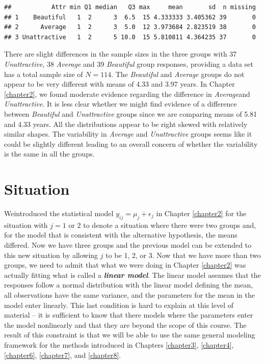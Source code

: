 \documentclass[]{book}
\begin{document}
\begin{verbatim}
##           Attr min Q1 median   Q3 max     mean       sd  n missing
## 1    Beautiful   1  2      3  6.5  15 4.333333 3.405362 39       0
## 2      Average   1  2      3  5.0  12 3.973684 2.823519 38       0
## 3 Unattractive   1  2      5 10.0  15 5.810811 4.364235 37       0
\end{verbatim}

There are slight differences in the sample sizes in the three groups
with 37 \emph{Unattractive}, 38 \emph{Average} and 39 \emph{Beautiful}
group responses, providing a data set has a total sample size of
\(N=114\). The \emph{Beautiful} and \emph{Average} groups do not appear
to be very different with means of 4.33 and 3.97 years. In Chapter
\ref{chapter2}, we found moderate evidence regarding the difference in
\emph{Average}and \emph{Unattractive}. It is less clear whether we might
find evidence of a difference between \emph{Beautiful} and
\emph{Unattractive} groups since we are comparing means of 5.81 and 4.33
years. All the distributions appear to be right skewed with relatively
similar shapes. The variability in \emph{Average} and
\emph{Unattractive} groups seems like it could be slightly different
leading to an overall concern of whether the variability is the same in
all the groups.

\section{Situation}\label{section3-1}

Weintroduced the statistical model \(y_{ij} = \mu_j+\epsilon_j\) in
Chapter \ref{chapter2} for the situation with \(j = 1 \text{ or } 2\) to
denote a situation where there were two groups and, for the model that
is consistent with the alternative hypothesis, the means differed. Now
we have three groups and the previous model can be extended to this new
situation by allowing \(j\) to be 1, 2, or 3. Now that we have more than
two groups, we need to admit that what we were doing in Chapter
\ref{chapter2} was actually fitting what is called a
\textbf{\emph{linear model}}. The linear model assumes that the
responses follow a normal distribution with the linear model defining
the mean, all observations have the same variance, and the parameters
for the mean in the model enter linearly. This last condition is hard to
explain at this level of material -- it is sufficient to know that there
models where the parameters enter the model nonlinearly and that they
are beyond the scope of this course. The result of this constraint is
that we will be able to use the same general modeling framework for the
methods introduced in Chapters \ref{chapter3}, \ref{chapter4},
\ref{chapter6}, \ref{chapter7}, and \ref{chapter8}.
\end{document}
